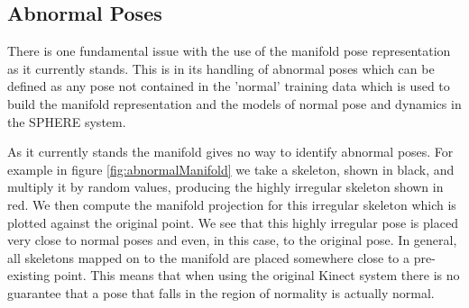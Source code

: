 \documentclass[11pt]{article} %
\begin{document}
\subsection{Abnormal Poses}

\label{sec:abnormals}

There is one fundamental issue with the use of the manifold pose representation as it currently stands. This is in its handling of abnormal poses which can be defined as any pose not contained in the 'normal' training data which is used to build the manifold representation and the models of normal pose and dynamics in the SPHERE system.

As it currently stands the manifold gives no way to identify abnormal poses. For example in figure \ref{fig:abnormalManifold} we take a skeleton, shown in black, and multiply it by random values, producing the highly irregular skeleton shown in red. We then compute the manifold projection for this irregular skeleton which is plotted against the original point. We see that this highly irregular pose is placed very close to normal poses and even, in this case, to the original pose. In general, all skeletons mapped on to the manifold are placed somewhere close to a pre-existing point. This means that when using the original Kinect system there is no guarantee that a pose that falls in the region of normality is actually normal. 
\end{document}
